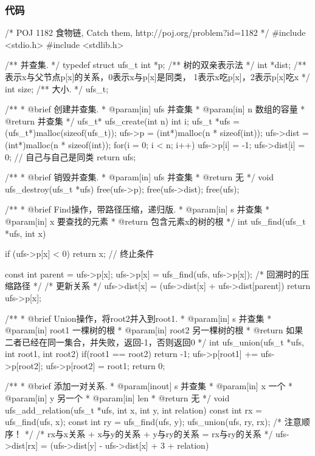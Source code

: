 \subsubsection{代码}
\begin{Codex}[label=food_chain.c]
/* POJ 1182 食物链, Catch them, http://poj.org/problem?id=1182 */
#include <stdio.h>
#include <stdlib.h>

/** 并查集. */
typedef struct ufs_t {
    int *p;     /** 树的双亲表示法 */
    int *dist;  /** 表示x与父节点p[x]的关系，0表示x与p[x]是同类，
                    1表示x吃p[x]，2表示p[x]吃x */
    int size;   /** 大小. */
} ufs_t;

/**
 * @brief 创建并查集.
 * @param[in] ufs 并查集
 * @param[in] n 数组的容量
 * @return 并查集
 */
ufs_t* ufs_create(int n) {
    int i;
    ufs_t *ufs = (ufs_t*)malloc(sizeof(ufs_t));
    ufs->p = (int*)malloc(n * sizeof(int));
    ufs->dist = (int*)malloc(n * sizeof(int));
    for(i = 0; i < n; i++) {
        ufs->p[i] = -1;
        ufs->dist[i] = 0; // 自己与自己是同类
    }
    return ufs;
}

/**
 * @brief 销毁并查集.
 * @param[in] ufs 并查集
 * @return 无
 */
void ufs_destroy(ufs_t *ufs) {
    free(ufs->p);
    free(ufs->dist);
    free(ufs);
}

/**
 * @brief Find操作，带路径压缩，递归版.
 * @param[in] s 并查集
 * @param[in] x 要查找的元素
 * @return 包含元素x的树的根
 */
int ufs_find(ufs_t *ufs, int x) {
    if (ufs->p[x] < 0) return x; // 终止条件

    const int parent = ufs->p[x];
    ufs->p[x] = ufs_find(ufs, ufs->p[x]); /* 回溯时的压缩路径 */
    /* 更新关系 */
    ufs->dist[x] = (ufs->dist[x] + ufs->dist[parent]) %
    return ufs->p[x];
}

/**
 * @brief Union操作，将root2并入到root1.
 * @param[in] s 并查集
 * @param[in] root1 一棵树的根
 * @param[in] root2 另一棵树的根
 * @return 如果二者已经在同一集合，并失败，返回-1，否则返回0
 */
int ufs_union(ufs_t *ufs, int root1, int root2) {
    if(root1 == root2) return -1;
    ufs->p[root1] += ufs->p[root2];
    ufs->p[root2] = root1;
    return 0;
}

/**
 * @brief 添加一对关系.
 * @param[inout] s 并查集
 * @param[in] x 一个
 * @param[in] y 另一个
 * @param[in] len
 * @return 无
 */
void ufs_add_relation(ufs_t *ufs, int x, int y, int relation) {
    const int rx = ufs_find(ufs, x);
    const int ry = ufs_find(ufs, y);
    ufs_union(ufs, ry, rx); /* 注意顺序！ */
    /* rx与x关系 + x与y的关系 + y与ry的关系 = rx与ry的关系 */
    ufs->dist[rx] = (ufs->dist[y] - ufs->dist[x] + 3 + relation) %
}


\end{Codex}
